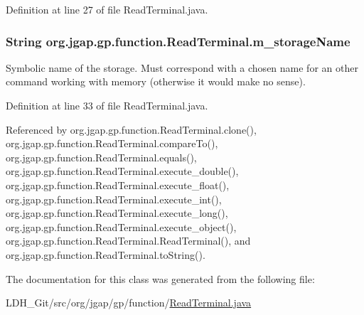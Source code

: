 Definition at line 27 of file Read\-Terminal.\-java.

\hypertarget{classorg_1_1jgap_1_1gp_1_1function_1_1_read_terminal_a4d070693575ea13b1de97b361253cf6e}{
\subsubsection[{m\-\_\-storage\-Name}]{\setlength{\rightskip}{0pt plus 5cm}String org.\-jgap.\-gp.\-function.\-Read\-Terminal.\-m\-\_\-storage\-Name\hspace{0.3cm}{\ttfamily [private]}}}\label{classorg_1_1jgap_1_1gp_1_1function_1_1_read_terminal_a4d070693575ea13b1de97b361253cf6e}
Symbolic name of the storage. Must correspond with a chosen name for an other command working with memory (otherwise it would make no sense). 

Definition at line 33 of file Read\-Terminal.\-java.



Referenced by org.\-jgap.\-gp.\-function.\-Read\-Terminal.\-clone(), org.\-jgap.\-gp.\-function.\-Read\-Terminal.\-compare\-To(), org.\-jgap.\-gp.\-function.\-Read\-Terminal.\-equals(), org.\-jgap.\-gp.\-function.\-Read\-Terminal.\-execute\-\_\-double(), org.\-jgap.\-gp.\-function.\-Read\-Terminal.\-execute\-\_\-float(), org.\-jgap.\-gp.\-function.\-Read\-Terminal.\-execute\-\_\-int(), org.\-jgap.\-gp.\-function.\-Read\-Terminal.\-execute\-\_\-long(), org.\-jgap.\-gp.\-function.\-Read\-Terminal.\-execute\-\_\-object(), org.\-jgap.\-gp.\-function.\-Read\-Terminal.\-Read\-Terminal(), and org.\-jgap.\-gp.\-function.\-Read\-Terminal.\-to\-String().



The documentation for this class was generated from the following file\-:\begin{DoxyCompactItemize}
\item 
L\-D\-H\-\_\-\-Git/src/org/jgap/gp/function/\hyperlink{_read_terminal_8java}{Read\-Terminal.\-java}\end{DoxyCompactItemize}

